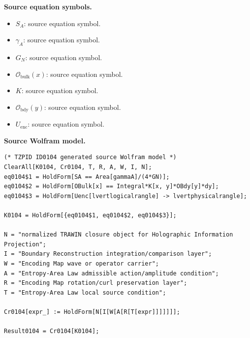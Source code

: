 \begin{minipage}[t]{0.49\linewidth}
\begingroup
\small
\raggedright
\textbf{Source equation symbols.}\par
\begin{itemize}[leftmargin=1.35em,itemsep=1pt,topsep=1pt,parsep=0pt]
    \item $S_A$: source equation symbol.
    \item $\gamma_A$: source equation symbol.
    \item $G_N$: source equation symbol.
    \item $\mathcal{O}_{\mathrm{bulk}}(x)$: source equation symbol.
    \item $K$: source equation symbol.
    \item $\mathcal{O}_{\mathrm{bdy}}(y)$: source equation symbol.
    \item $U_{\mathrm{enc}}$: source equation symbol.
\end{itemize}
\endgroup
\end{minipage}\hfill
\begin{minipage}[t]{0.47\linewidth}
\begingroup
\scriptsize
\raggedright
\textbf{Source Wolfram model.}\par
\begin{Verbatim}[fontsize=\tiny,breaklines=true,breakanywhere=true]
(* TZPID ID0104 generated source Wolfram model *)
ClearAll[K0104, Cr0104, T, R, A, W, I, N];
eq0104$1 = HoldForm[SA == Area[gammaA]/(4*GN)];
eq0104$2 = HoldForm[OBulk[x] == Integral*K[x, y]*OBdy[y]*dy];
eq0104$3 = HoldForm[Uenc[lvertlogicalrangle] -> lvertphysicalrangle];

K0104 = HoldForm[{eq0104$1, eq0104$2, eq0104$3}];

N = "normalized TRAWIN closure object for Holographic Information Projection";
I = "Boundary Reconstruction integration/comparison layer";
W = "Encoding Map wave or operator carrier";
A = "Entropy-Area Law admissible action/amplitude condition";
R = "Encoding Map rotation/curl preservation layer";
T = "Entropy-Area Law local source condition";

Cr0104[expr_] := HoldForm[N[I[W[A[R[T[expr]]]]]]];

Result0104 = Cr0104[K0104];
\end{Verbatim}
\endgroup
\end{minipage}

